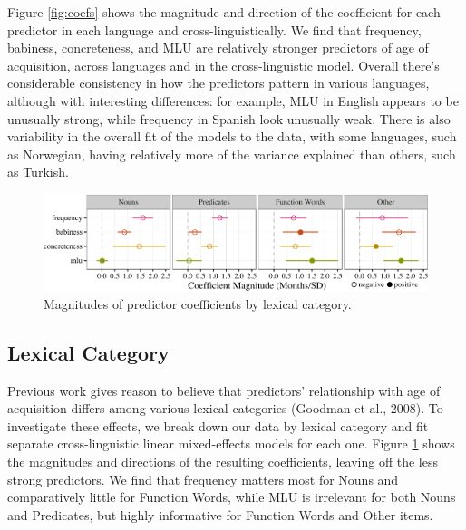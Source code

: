 \documentclass[10pt, letterpaper]{article}
\newenvironment{CodeChunk}{}{}
\begin{document}
Figure \ref{fig:coefs} shows the magnitude and direction of the
coefficient for each predictor in each language and
cross-linguistically. We find that frequency, babiness, concreteness,
and MLU are relatively stronger predictors of age of acquisition, across
languages and in the cross-linguistic model. Overall there's
considerable consistency in how the predictors pattern in various
languages, although with interesting differences: for example, MLU in
English appears to be unusually strong, while frequency in Spanish look
unusually weak. There is also variability in the overall fit of the
models to the data, with some languages, such as Norwegian, having
relatively more of the variance explained than others, such as Turkish.

\begin{CodeChunk}
\begin{figure}[tb]

{\centering \includegraphics{figs/coefs_lexcat-1} 

}

\caption[Magnitudes of predictor coefficients by lexical category]{Magnitudes of predictor coefficients by lexical category.}\label{fig:coefs_lexcat}
\end{figure}
\end{CodeChunk}

\subsection{Lexical Category}\label{lexical-category}

Previous work gives reason to believe that predictors' relationship with
age of acquisition differs among various lexical categories (Goodman et
al., 2008). To investigate these effects, we break down our data by
lexical category and fit separate cross-linguistic linear mixed-effects
models for each one. Figure \ref{fig:coefs_lexcat} shows the magnitudes
and directions of the resulting coefficients, leaving off the less
strong predictors. We find that frequency matters most for Nouns and
comparatively little for Function Words, while MLU is irrelevant for
both Nouns and Predicates, but highly informative for Function Words and
Other items.
\end{document}
